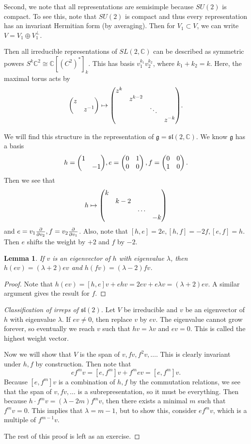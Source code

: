\documentclass[leqno, openany]{memoir}
\newtheorem{lem}[thm]{Lemma}
\theoremstyle{definition}
\theoremstyle{remark}
\theoremstyle{plain}
\theoremstyle{definition}
\theoremstyle{remark}
\newcommand{\C}{\mathbb{C}}
\newcommand{\mf}[1]{\mathfrak{#1}}
\begin{document}
Second, we note that all representations are semisimple because $SU(2)$ is compact. To see this, note that $SU(2)$ is compact and thus every representation has an invariant Hermitian form (by averaging). Then for $V_1 \subset V$, we can write $V = V_1 \oplus V_1^{\perp}$.

Then all irreducible representations of $SL(2, \C)$ can be described as symmetric powers $S^k \C^2 \cong \C[(C^2)^*]_k$. This has basis $v_1^{k_1} v_2^{k_2}$, where $k_1 + k_2 = k$. Here, the maximal torus acts by
\[ \mqty(\dmat{z,z^{-1}}) \mapsto \mqty(\dmat{z^k, z^{k-2}, \ddots, z^{-k}}). \]

    We will find this structure in the representation of $\mf{g} = \mf{sl}(2, \C)$. We know $\mf{g}$ has a basis 
    \[ h = \mqty(\dmat{1,-1}), e = \begin{pmatrix}
            0 & 1 \\ 0 & 0
        \end{pmatrix}, f = \begin{pmatrix}
            0 & 0 \\ 1 & 0
        \end{pmatrix}. \]
    Then we see that
    \[ h \mapsto \mqty(\dmat{k, k-2, \ldots, -k}) \]
    and $e = v_1 \pdv{v_2}, f = v_2 \pdv{v_1}$. Also, note that $[h,e] = 2e, [h,f] = -2f, [e,f] = h$. Then $e$ shifts the weight by $+2$ and $f$ by $-2$.

\begin{lem}
    If $v$ is an eigenvector of $h$ with eigenvalue $\lambda$, then $h(ev) = (\lambda + 2) ev$ and $h(fv) =(\lambda -2) fv$.
\end{lem}

\begin{proof}
    Note that $h(ev) = [h,e]v + ehv = 2ev + e \lambda v = (\lambda + 2)ev$. A similar argument gives the result for $f$.
\end{proof}

\begin{proof}[Classification of irreps of $\mf{sl}(2)$]
    Let $V$ be irreducible and $v$ be an eigenvector of $h$ with eigenvalue $\lambda$. If $ev \neq 0$, then replace $v$ by $ev$. The eigenvalue cannot grow forever, so eventually we reach $v$ such that $hv = \lambda v$ and $ev = 0$. This is called the highest weight vector.

    Now we will show that $V$ is the span of $v, fv, f^2 v, \ldots$. This is clearly invariant under $h,f$ by construction. Then note that
    \[ ef^m v = [e, f^m]v + f^m ev = [e,f^m]v. \]
    Because $[e,f^m]v$ is a combination of $h,f$ by the commutation relations, we see that the span of $v, fv, \ldots$ is a subrepresentation, so it must be everything. Then because $h \cdot f^m v = (\lambda - 2m) f^m v$, then there exists a minimal $m$ such that $f^m v = 0$. This implies that $\lambda = m-1$, but to show this, consider $ef^m v$, which is a multiple of $f^{m-1}v$.

    The rest of this proof is left as an exercise.
\end{proof}
\end{document}
